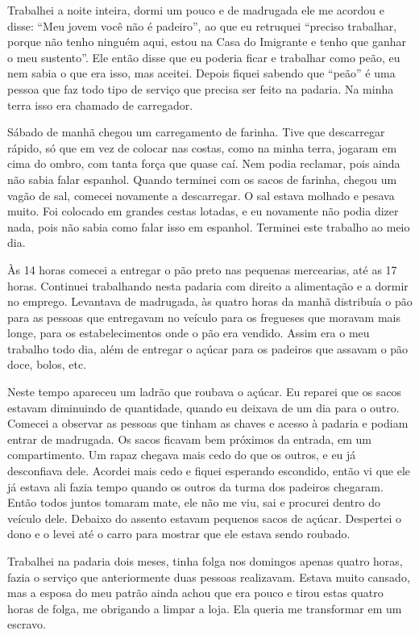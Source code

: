Trabalhei a noite inteira, dormi um pouco e de madrugada ele me acordou
e disse: ``Meu jovem você não é padeiro'', ao que eu retruquei ``preciso
trabalhar, porque não tenho ninguém aqui, estou na Casa do Imigrante e
tenho que ganhar o meu sustento''. Ele então disse que eu poderia ficar
e trabalhar como peão, eu nem sabia o que era isso, mas aceitei. Depois
fiquei sabendo que ``peão'' é uma pessoa que faz todo tipo de serviço
que precisa ser feito na padaria. Na minha terra isso era chamado de
carregador.

Sábado de manhã chegou um carregamento de farinha. Tive que descarregar
rápido, só que em vez de colocar nas costas, como na minha terra,
jogaram em cima do ombro, com tanta força que quase caí. Nem podia
reclamar, pois ainda não sabia falar espanhol. Quando terminei com os
sacos de farinha, chegou um vagão de sal, comecei novamente a
descarregar. O sal estava molhado e pesava muito. Foi colocado em
grandes cestas lotadas, e eu novamente não podia dizer nada, pois não
sabia como falar isso em espanhol. Terminei este trabalho ao meio dia.

Às 14 horas comecei a entregar o pão preto nas pequenas mercearias, até
as 17 horas. Continuei trabalhando nesta padaria com direito a
alimentação e a dormir no emprego. Levantava de madrugada, às quatro
horas da manhã distribuía o pão para as pessoas que entregavam no
veículo para os fregueses que moravam mais longe, para os
estabelecimentos onde o pão era vendido. Assim era o meu trabalho todo
dia, além de entregar o açúcar para os padeiros que assavam o pão doce,
bolos, etc.

Neste tempo apareceu um ladrão que roubava o açúcar. Eu reparei que os
sacos estavam diminuindo de quantidade, quando eu deixava de um dia para
o outro. Comecei a observar as pessoas que tinham as chaves e acesso à
padaria e podiam entrar de madrugada. Os sacos ficavam bem próximos da
entrada, em um compartimento. Um rapaz chegava mais cedo do que os
outros, e eu já desconfiava dele. Acordei mais cedo e fiquei esperando
escondido, então vi que ele já estava ali fazia tempo quando os outros
da turma dos padeiros chegaram. Então todos juntos tomaram mate, ele não
me viu, sai e procurei dentro do veículo dele. Debaixo do assento
estavam pequenos sacos de açúcar. Despertei o dono e o levei até o carro
para mostrar que ele estava sendo roubado.

Trabalhei na padaria dois meses, tinha folga nos domingos apenas quatro
horas, fazia o serviço que anteriormente duas pessoas realizavam. Estava
muito cansado, mas a esposa do meu patrão ainda achou que era pouco e
tirou estas quatro horas de folga, me obrigando a limpar a loja. Ela
queria me transformar em um escravo.

